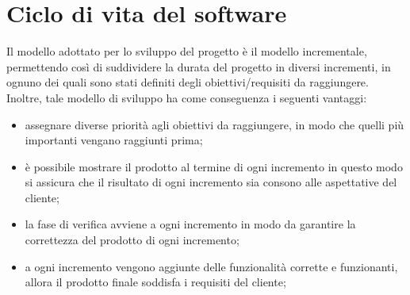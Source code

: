 
\section{Ciclo di vita del software}\label{sec:ciclo-vita-software}
Il modello adottato per lo sviluppo del progetto è il modello incrementale, permettendo così di suddividere la durata del progetto in diversi incrementi, in ognuno dei quali sono stati definiti degli obiettivi/requisiti da raggiungere.
Inoltre, tale modello di sviluppo ha come conseguenza i seguenti vantaggi:
\begin{itemize}
    \item assegnare diverse priorità agli obiettivi da raggiungere, in modo che quelli più importanti vengano raggiunti prima;
    \item è possibile mostrare il prodotto al termine di ogni incremento in questo modo si assicura che il risultato di ogni incremento sia consono alle aspettative del cliente;
    \item la fase di verifica avviene a ogni incremento in modo da garantire la correttezza del prodotto di ogni incremento;
    \item a ogni incremento vengono aggiunte delle funzionalità corrette e funzionanti, allora il prodotto finale soddisfa i requisiti del cliente;
\end{itemize}